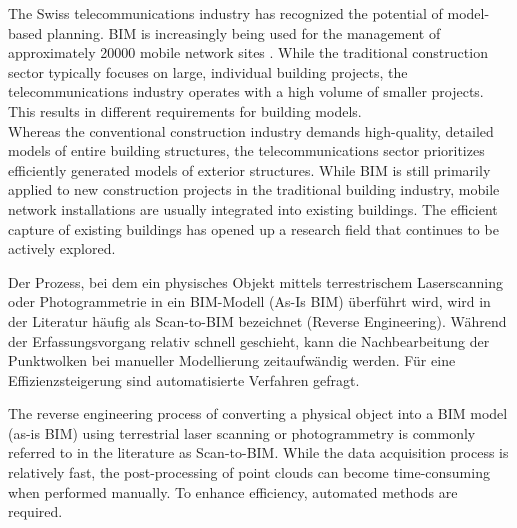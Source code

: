 \begin{English}
    The Swiss telecommunications industry has recognized the potential of model-based planning. BIM is increasingly being used for the management of approximately 20000 mobile network sites \cite{federalofficeofcommunicationsofcomLocationsMobilePhone}. While the traditional construction sector typically focuses on large, individual building projects, the telecommunications industry operates with a high volume of smaller projects. This results in different requirements for building models. \\
    Whereas the conventional construction industry demands high-quality, detailed models of entire building structures, the telecommunications sector prioritizes efficiently generated models of exterior structures. While BIM is still primarily applied to new construction projects in the traditional building industry, mobile network installations are usually integrated into existing buildings. The efficient capture of existing buildings has opened up a research field that continues to be actively explored.
\end{English}

\begin{German}
    Der Prozess, bei dem ein physisches Objekt mittels terrestrischem Laserscanning oder Photogrammetrie in ein BIM-Modell (As-Is BIM) überführt wird, wird in der Literatur häufig als Scan-to-BIM bezeichnet (Reverse Engineering). Während der Erfassungsvorgang relativ schnell geschieht, kann die Nachbearbeitung der Punktwolken bei manueller Modellierung zeitaufwändig werden. Für eine Effizienzsteigerung sind automatisierte Verfahren gefragt.
\end{German}

\begin{English}
    The reverse engineering process of converting a physical object into a BIM model (as-is BIM) using terrestrial laser scanning or photogrammetry is commonly referred to in the literature as Scan-to-BIM. While the data acquisition process is relatively fast, the post-processing of point clouds can become time-consuming when performed manually. To enhance efficiency, automated methods are required.
\end{English}

